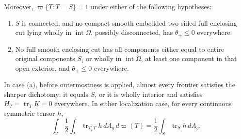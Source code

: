 \begin{proposition}
Moreover, $\varpi\{T:T=S\}=1$ under either of the following hypotheses:
\begin{enumerate}
\item[(a)] $S$ is connected, and no compact smooth embedded two-sided
full enclosing cut lying wholly in $\operatorname{int}\Omega$, possibly
disconnected, has $\theta_+\le0$ everywhere.
\item[(b)] No full smooth enclosing cut has all components either equal
to entire original components $S_i$ or wholly in
$\operatorname{int}\Omega$, at least one component in that open exterior,
and $\theta_+\le0$ everywhere.
\end{enumerate}
In case \textup{(a)}, before outermostness is applied, almost every
frontier satisfies the sharper dichotomy: it equals $S$, or it is
wholly interior and satisfies $H_T=\operatorname{tr}_T K=0$ everywhere.
In either localization case, for every continuous symmetric tensor $h$,
\begin{equation}
 \int_{\mathcal T}\frac12\int_T\operatorname{tr}_{T_xT}h\,dA_g
                                  \,d\varpi(T)
       =\frac12\int_S\operatorname{tr}_S h\,dA_g.
 \label{eq:variation:smooth-localized-area}
\end{equation}
\end{proposition}


